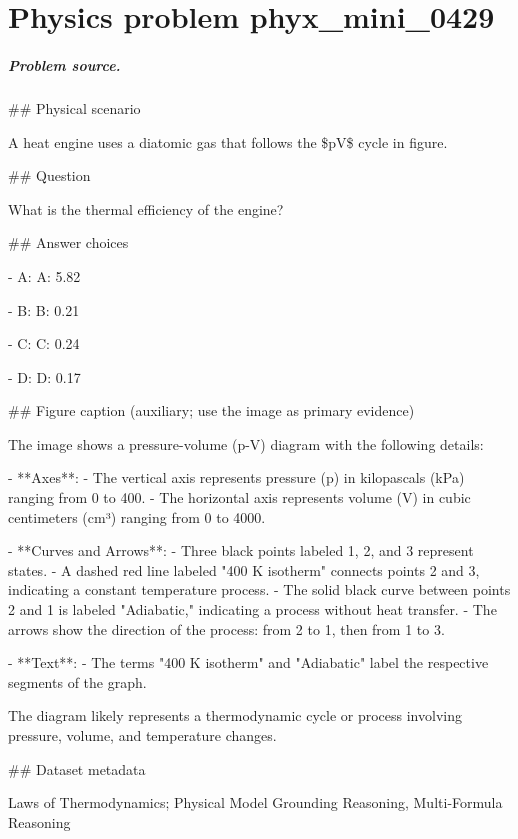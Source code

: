 
\chapter{Physics problem phyx\_mini\_0429}
\label{ch:PhyXMiniProblems_problem_phyx_mini_0429}

\paragraph{Problem source.}
\#\# Physical scenario

A heat engine uses a diatomic gas that follows the \$pV\$ cycle in figure.

\#\# Question

What is the thermal efficiency of the engine?

\#\# Answer choices

- A: A: 5.82

- B: B: 0.21

- C: C: 0.24

- D: D: 0.17

\#\# Figure caption (auxiliary; use the image as primary evidence)

The image shows a pressure-volume (p-V) diagram with the following details:

- **Axes**:
  - The vertical axis represents pressure (p) in kilopascals (kPa) ranging from 0 to 400.
  - The horizontal axis represents volume (V) in cubic centimeters (cm³) ranging from 0 to 4000.

- **Curves and Arrows**:
  - Three black points labeled 1, 2, and 3 represent states.
  - A dashed red line labeled "400 K isotherm" connects points 2 and 3, indicating a constant temperature process.
  - The solid black curve between points 2 and 1 is labeled "Adiabatic," indicating a process without heat transfer.
  - The arrows show the direction of the process: from 2 to 1, then from 1 to 3.

- **Text**:
  - The terms "400 K isotherm" and "Adiabatic" label the respective segments of the graph.

The diagram likely represents a thermodynamic cycle or process involving pressure, volume, and temperature changes.

\#\# Dataset metadata

Laws of Thermodynamics; Physical Model Grounding Reasoning, Multi-Formula Reasoning

